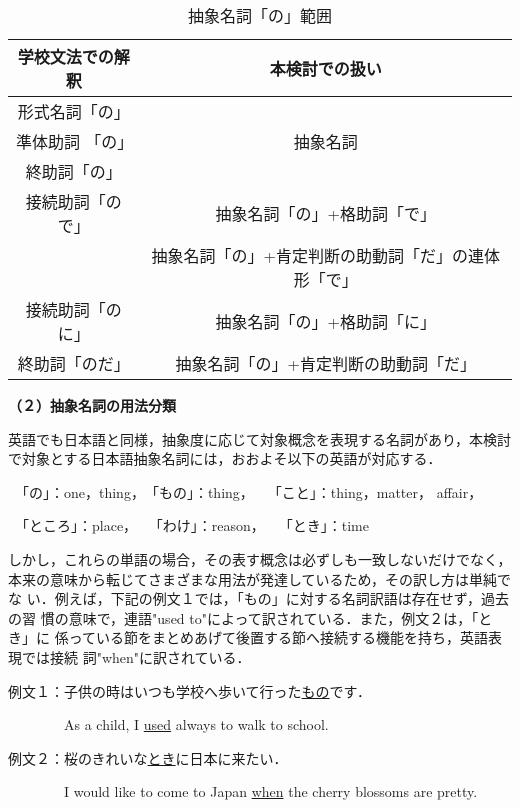 \begin{table}[htbp]
\caption{抽象名詞「の」範囲}
\begin{center}
\begin{tabular}{|c|c|} \hline
学校文法での解釈 & 本検討での扱い\\ \hline
形式名詞「の」 & \\
準体助詞 「の」& 抽象名詞\\
終助詞「の」 & \\ \hline
接続助詞「ので」 & 抽象名詞「の」+格助詞「で」\\
 & 抽象名詞「の」+肯定判断の助動詞「だ」の連体形「で」\\ \hline
接続助詞「のに」 & 抽象名詞「の」+格助詞「に」\\ \hline
終助詞「のだ」 & 抽象名詞「の」+肯定判断の助動詞「だ」\\ \hline
\end{tabular}
\end{center}
\end{table}

{\bf （２）抽象名詞の用法分類}

英語でも日本語と同様，抽象度に応じて対象概念を表現する名詞があり，本検討
で対象とする日本語抽象名詞には，おおよそ以下の英語が対応する．

　「の」：one，thing，　「もの」：thing，　　「こと」：thing，matter，
affair，

　「ところ」：place， 　「わけ」：reason，　　「とき」：time

しかし，これらの単語の場合，その表す概念は必ずしも一致しないだけでなく，
本来の意味から転じてさまざまな用法が発達しているため，その訳し方は単純でな
い．例えば，下記の例文１では，「もの」に対する名詞訳語は存在せず，過去の習
慣の意味で，連語"used to"によって訳されている．また，例文２は，「とき」に
係っている節をまとめあげて後置する節へ接続する機能を持ち，英語表現では接続
詞"when"に訳されている．

\vspace{6pt}

例文１：子供の時はいつも学校へ歩いて行った\underline{もの}です．

　　　　As a child, I \underline{used} always to walk to school. 

例文２：桜のきれいな\underline{とき}に日本に来たい．

　　　　I would like to come to Japan \underline{when} the cherry blossoms are
  pretty.

\vspace{6pt}

